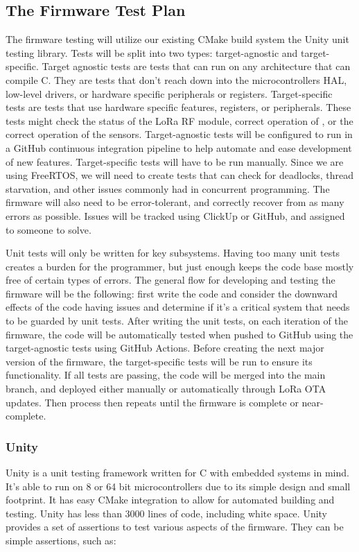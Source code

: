 \subsection{The Firmware Test Plan}
The firmware testing will utilize our existing CMake build system the Unity unit
testing library. Tests will be split into two types: target-agnostic and
target-specific. Target agnostic tests are tests that can run on any
architecture that can compile C. They are tests that don't reach down
into the microcontrollers HAL, low-level drivers, or hardware specific
peripherals or registers. Target-specific tests are tests that use hardware
specific features, registers, or peripherals. These tests might check the status
of the LoRa RF module, correct operation of \iic, or the correct operation of
the sensors. Target-agnostic tests will be configured to run in a GitHub
continuous integration pipeline to help automate and ease development of new
features. Target-specific tests will have to be run manually. Since we are using
FreeRTOS, we will need to create tests that can check for deadlocks, thread
starvation, and other issues commonly had in concurrent programming. The
firmware will also need to be error-tolerant, and correctly recover from as many
errors as possible. Issues will be tracked using ClickUp or GitHub, and assigned
to someone to solve.

Unit tests will only be written for key subsystems. Having too many unit tests
creates a burden for the programmer, but just enough keeps the code base mostly
free of certain types of errors. The general flow for developing and testing the
firmware will be the following: first write the code and consider the downward
effects of the code having issues and determine if it's a critical system that
needs to be guarded by unit tests. After writing the unit tests, on each
iteration of the firmware, the code will be automatically tested when pushed to
GitHub using the target-agnostic tests using GitHub Actions. Before creating the
next major version of the firmware, the target-specific tests will be run to
ensure its functionality. If all tests are passing, the code will be merged into
the main branch, and deployed either manually or automatically through LoRa OTA
updates. Then process then repeats until the firmware is complete or
near-complete.

\subsubsection{Unity}
Unity is a unit testing framework written for C with embedded systems in mind.
It's able to run on 8 or 64 bit microcontrollers due to its simple design and
small footprint. It has easy CMake integration to allow for automated building
and testing. Unity has less than 3000 lines of code, including white space.
Unity provides a set of assertions to test various aspects of the firmware. They
can be simple assertions, such as:


